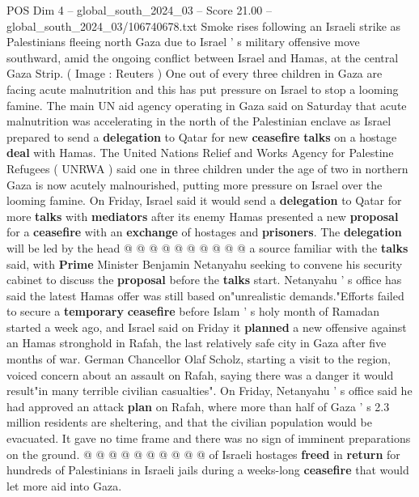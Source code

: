 \begin{textsample}{POS Dim 4 – global\_south\_2024\_03 – Score 21.00 – global\_south\_2024\_03/106740678.txt}  \label{ex:f4_pos_102}
Smoke rises following an Israeli strike as Palestinians fleeing north Gaza due to Israel ' s military offensive move southward, amid the ongoing conflict between Israel and Hamas, at the central Gaza Strip. ( Image : Reuters ) One out of every three children in Gaza are facing acute malnutrition and this has put pressure on Israel to stop a looming famine.
The main UN aid agency operating in Gaza said on Saturday that acute malnutrition was accelerating in the north of the Palestinian enclave as Israel prepared to send a \textbf{delegation} to Qatar for new \textbf{ceasefire} \textbf{talks} on a hostage \textbf{deal} with Hamas.
The United Nations Relief and Works Agency for Palestine Refugees ( UNRWA ) said one in three children under the age of two in northern Gaza is now acutely malnourished, putting more pressure on Israel over the looming famine.
On Friday, Israel said it would send a \textbf{delegation} to Qatar for more \textbf{talks} with \textbf{mediators} after its enemy Hamas presented a new \textbf{proposal} for a \textbf{ceasefire} with an \textbf{exchange} of hostages and \textbf{prisoners}.
The \textbf{delegation} will be led by the head @ @ @ @ @ @ @ @ @ @ a source familiar with the \textbf{talks} said, with \textbf{Prime} Minister Benjamin Netanyahu seeking to convene his security cabinet to discuss the \textbf{proposal} before the \textbf{talks} start.
Netanyahu ' s office has said the latest Hamas offer was still based on"unrealistic demands."Efforts failed to secure a \textbf{temporary} \textbf{ceasefire} before Islam ' s holy month of Ramadan started a week ago, and Israel said on Friday it \textbf{planned} a new offensive against an Hamas stronghold in Rafah, the last relatively safe city in Gaza after five months of war.
German Chancellor Olaf Scholz, starting a visit to the region, voiced concern about an assault on Rafah, saying there was a danger it would result"in many terrible civilian casualties".
On Friday, Netanyahu ' s office said he had approved an attack \textbf{plan} on Rafah, where more than half of Gaza ' s 2.3 million residents are sheltering, and that the civilian population would be evacuated.
It gave no time frame and there was no sign of imminent preparations on the ground. @ @ @ @ @ @ @ @ @ @ of Israeli hostages \textbf{freed} in \textbf{return} for hundreds of Palestinians in Israeli jails during a weeks-long \textbf{ceasefire} that would let more aid into Gaza.

\end{textsample}
